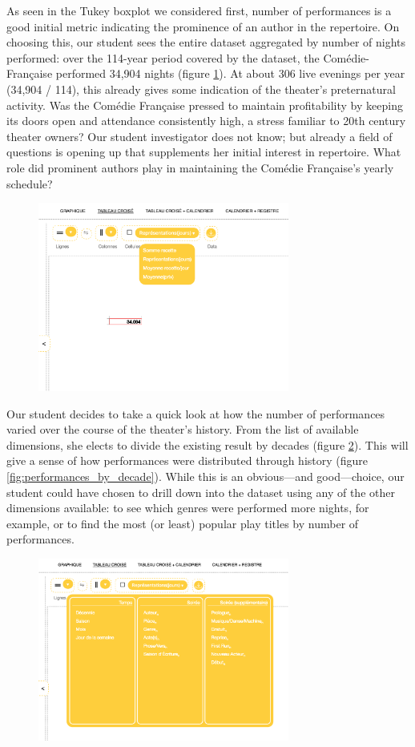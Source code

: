 \documentclass[	DIV=calc,%
							paper=a4,%
							fontsize=11pt,%
							twocolumn]{scrartcl}	 					%
\begin{document}
As seen in the Tukey boxplot we considered first, number of performances is a good initial metric indicating the prominence of an author in the repertoire.  On choosing this, our student sees the entire dataset aggregated by number of nights performed: over the 114-year period covered by the dataset, the Comédie-Française performed 34,904 nights (figure \ref{fig:opening}).  At about 306 live evenings per year (34,904 / 114), this already gives some indication of the theater’s preternatural activity.  Was the Comédie Française pressed to maintain profitability by keeping its doors open and attendance consistently high, a stress familiar to 20th century theater owners?  Our student investigator does not know; but already a field of questions is opening up that supplements her initial interest in repertoire.  What role did prominent authors play in maintaining the Comédie Française’s yearly schedule?

\begin{figure}
  \centering
	\includegraphics[width=3.25in]{steps/opening.png}
	\caption{}
	\label{fig:opening}
\end{figure}

Our student decides to take a quick look at how the number of performances varied over the course of the theater’s history.  From the list of available dimensions, she elects to divide the existing result by decades (figure \ref{fig:dimensions}).  This will give a sense of how performances were distributed through history (figure \ref{fig:performances_by_decade}).  While this is an obvious—and good—choice, our student could have chosen to drill down into the dataset using any of the other dimensions available: to see which genres were performed more nights, for example, or to find the most (or least) popular play titles by number of performances.

\begin{figure}
  \centering
	\includegraphics[width=3.25in]{steps/dimensions.png}
	\caption{}
	\label{fig:dimensions}
\end{figure}
\end{document}
